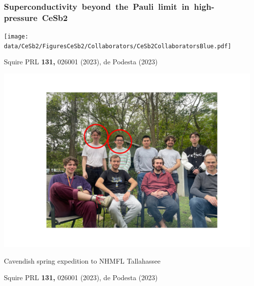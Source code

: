 


\begin{frame}[plain,label=CeSb2Grouplist]
    \frametitle {\mbox{Superconductivity beyond the Pauli limit in high-pressure CeSb2}}
    \texttt{[image: \\data/CeSb2/FiguresCeSb2/Collaborators/CeSb2CollaboratorsBlue.pdf]}
    \vfill
\centerline{\makebox[\linewidth]{\rule{0.85\textwidth}{0.4pt}}}

\centerline{\scriptsize Squire PRL {\bf 131,} 026001 (2023), de Podesta (2023)}

\end{frame}
    
\begin{frame}
\centerline{ \includegraphics[width=\columnwidth]{GroupPhoto}}

\centerline{\small Cavendish spring expedition to NHMFL Tallahassee}

\vspace{0em}
\centerline{\makebox[\linewidth]{\rule{0.85\textwidth}{0.4pt}}}

\centerline{\scriptsize Squire PRL {\bf 131,} 026001 (2023), de Podesta (2023)}

\end{frame}
        

